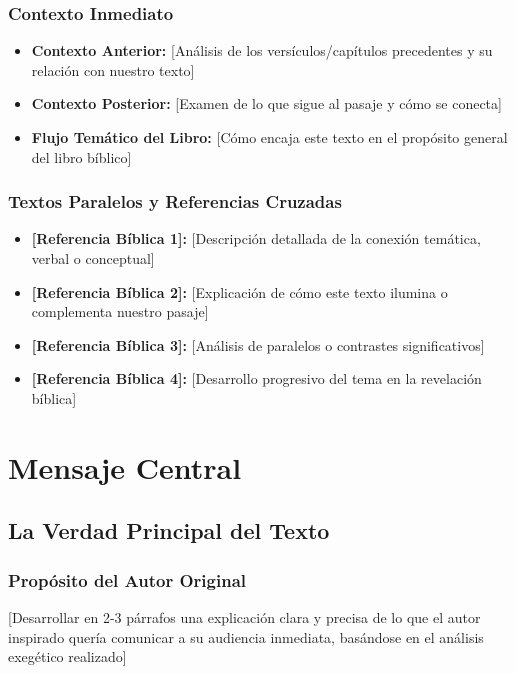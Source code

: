 \documentclass[12pt,a4paper]{article}
\begin{document}
\subsubsection{Contexto Inmediato}

\begin{itemize}[leftmargin=*]
    \item \textbf{Contexto Anterior:} [Análisis de los versículos/capítulos precedentes y su relación con nuestro texto]
    \item \textbf{Contexto Posterior:} [Examen de lo que sigue al pasaje y cómo se conecta]
    \item \textbf{Flujo Temático del Libro:} [Cómo encaja este texto en el propósito general del libro bíblico]
\end{itemize}

\subsubsection{Textos Paralelos y Referencias Cruzadas}

\begin{itemize}[leftmargin=*]
    \item \textbf{[Referencia Bíblica 1]:} [Descripción detallada de la conexión temática, verbal o conceptual]
    \item \textbf{[Referencia Bíblica 2]:} [Explicación de cómo este texto ilumina o complementa nuestro pasaje]
    \item \textbf{[Referencia Bíblica 3]:} [Análisis de paralelos o contrastes significativos]
    \item \textbf{[Referencia Bíblica 4]:} [Desarrollo progresivo del tema en la revelación bíblica]
\end{itemize}

\section{Mensaje Central}

\subsection{La Verdad Principal del Texto}

\subsubsection{Propósito del Autor Original}
[Desarrollar en 2-3 párrafos una explicación clara y precisa de lo que el autor inspirado quería comunicar a su audiencia inmediata, basándose en el análisis exegético realizado]
\end{document}
